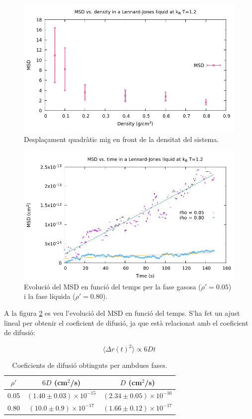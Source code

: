 \documentclass[a4paper,10pt]{article}
\begin{document}
\begin{figure}
	\centering
	\includegraphics[width=\linewidth]{MSD}
	\caption{Desplaçament quadràtic mig en front de la densitat del sistema. }
	\label{fig:msd}
\end{figure}


\begin{figure}
	\centering
	\includegraphics[width=\linewidth]{MSD_evol}
	\caption{Evolució del MSD en funció del temps per la fase gasosa ($\rho' = 0.05$) i la fase líquida ($\rho' = 0.80$).}
	\label{fig:msdevol}
\end{figure}

A la figura \ref{fig:msdevol} es veu l'evolució del MSD en funció del temps. S'ha fet un ajust lineal per obtenir el coeficient de difusió, ja que està relacionat amb el coeficient de difusió:

$$ \langle \Delta r(t)^2 \rangle \propto 6Dt $$ 

\begin{table}
	\centering
	\begin{tabular}{|c|c|c|}
		\hline
		$\rho'$ & $6D$ (cm$^2$/s) & $D$ (cm$^2$/s) \\
		\hline
		0.05 &  $(1.40 \pm 0.03) \times 10^{-15}$ & $(2.34 \pm 0.05 )\times 10^{-16}$ \\
		\hline
		0.80 &  $(10.0 \pm 0.9) \times 10^{-17}$ & $(1.66 \pm 0.12) \times 10^{-17}$\\
		\hline
	\end{tabular}
	\caption{Coeficients de difusió obtinguts per ambdues fases.}
	\label{tab:coeficients}
\end{table}
\end{document}

